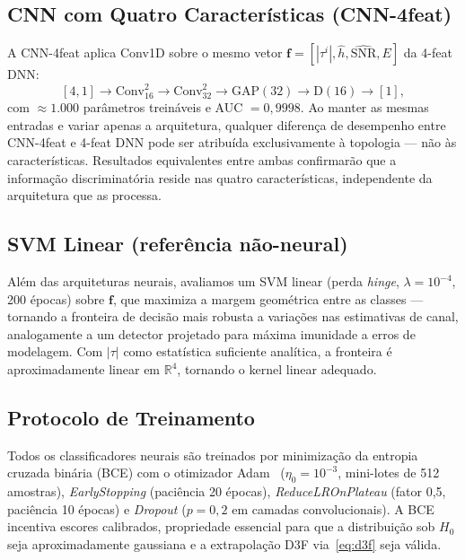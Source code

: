 \documentclass{sbrt}
\begin{document}
\subsection{CNN com Quatro Características (CNN-4feat)}\label{sec:cnn4feat}

A CNN-4feat aplica Conv1D sobre o mesmo vetor $\mathbf{f} = [|\tau^i|, \hat{h}, \widehat{\text{SNR}}, E]$ da 4-feat DNN:
\begin{equation}\label{eq:cnn4feat}
[4,1]\!\to\!\text{Conv}_{16}^{2}\!\to\!\text{Conv}_{32}^{2}\!\to\!\text{GAP}(32)\!\to\!\text{D}(16)\!\to\![1],
\end{equation}
com ${\approx}1{.}000$ parâmetros treináveis e AUC $= 0{,}9998$. Ao manter as mesmas entradas e variar apenas a arquitetura, qualquer diferença de desempenho entre CNN-4feat e 4-feat DNN pode ser atribuída exclusivamente à topologia — não às características. Resultados equivalentes entre ambas confirmarão que a informação discriminatória reside nas quatro características, independente da arquitetura que as processa.

\subsection{SVM Linear (referência não-neural)}\label{sec:svm}

Além das arquiteturas neurais, avaliamos um SVM linear (perda \textit{hinge}, $\lambda = 10^{-4}$, 200 épocas) sobre $\mathbf{f}$, que maximiza a margem geométrica entre as classes — tornando a fronteira de decisão mais robusta a variações nas estimativas de canal, analogamente a um detector projetado para máxima imunidade a erros de modelagem. Com $|\tau|$ como estatística suficiente analítica, a fronteira é aproximadamente linear em $\mathbb{R}^4$, tornando o kernel linear adequado.

\subsection{Protocolo de Treinamento}

Todos os classificadores neurais são treinados por minimização da entropia cruzada binária (BCE) com o otimizador Adam~\cite{ref_adam} ($\eta_0 = 10^{-3}$, mini-lotes de 512 amostras), \textit{EarlyStopping} (paciência 20 épocas), \textit{ReduceLROnPlateau} (fator 0,5, paciência 10 épocas) e \textit{Dropout} ($p = 0{,}2$ em camadas convolucionais). A BCE incentiva escores calibrados, propriedade essencial para que a distribuição sob $H_0$ seja aproximadamente gaussiana e a extrapolação D3F via~\eqref{eq:d3f} seja válida.
\end{document}

